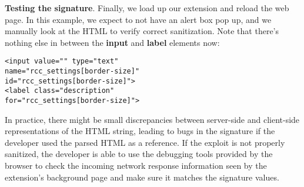 \textbf{Testing the signature}. Finally, we load up our extension and reload the web page. In this example, we expect to not have an alert box pop up, and we manually look at the HTML to verify correct sanitization. Note that there's nothing else in between the \textbf{input} and \textbf{label} elements now:

\begin{lstlisting}
<input value="" type="text" 
name="rcc_settings[border-size]" 
id="rcc_settings[border-size]">
<label class="description"
for="rcc_settings[border-size]">
\end{lstlisting}

In practice, there might be small discrepancies between server-side and client-side representations of the HTML string, leading to bugs in the signature if the developer used the parsed HTML as a reference. If the exploit is not properly sanitized, the developer is able to use the debugging tools provided by the browser to check the incoming network response information seen by the extension's background page and make sure it matches the signature values.

\iffalse
